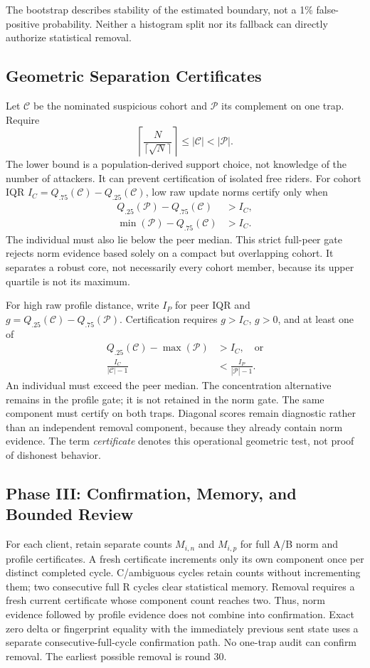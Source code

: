 \documentclass[conference]{IEEEtran}
\begin{document}
The bootstrap describes stability of the estimated boundary, not a 1\%
false-positive probability. Neither a histogram split nor its fallback can
directly authorize statistical removal.

\subsection{Geometric Separation Certificates}
Let $\mathcal C$ be the nominated suspicious cohort and $\mathcal P$ its
complement on one trap. Require
\begin{equation}
 \left\lceil\frac{N}{\lceil\sqrt N\rceil}\right\rceil
 \leq|\mathcal C|<|\mathcal P|.
\end{equation}
The lower bound is a population-derived support choice, not knowledge of the
number of attackers. It can prevent certification of isolated free riders.
For cohort IQR $I_C=Q_{.75}(\mathcal C)-Q_{.25}(\mathcal C)$, low raw update
norms certify only when
\begin{align}
 Q_{.25}(\mathcal P)-Q_{.75}(\mathcal C)&>I_C,\\
 \min(\mathcal P)-Q_{.75}(\mathcal C)&>I_C.
\end{align}
The individual must also lie below the peer median. This strict full-peer gate
rejects norm evidence based solely on a compact but overlapping cohort. It
separates a robust core, not necessarily every cohort member, because its upper
quartile is not its maximum.

For high raw profile distance, write $I_P$ for peer IQR and
$g=Q_{.25}(\mathcal C)-Q_{.75}(\mathcal P)$. Certification requires $g>I_C$,
$g>0$, and at least one of
\begin{align}
 Q_{.25}(\mathcal C)-\max(\mathcal P)&>I_C,\quad\text{or}\\
 \frac{I_C}{|\mathcal C|-1}&<\frac{I_P}{|\mathcal P|-1}.
\end{align}
An individual must exceed the peer median. The concentration alternative remains
in the profile gate; it is not retained in the norm gate. The same component
must certify on both traps. Diagonal scores remain diagnostic rather than an
independent removal component, because they already contain norm evidence.
The term \emph{certificate} denotes this operational geometric test, not proof
of dishonest behavior.

\subsection{Phase III: Confirmation, Memory, and Bounded Review}
For each client, retain separate counts $M_{i,n}$ and $M_{i,p}$ for full A/B
norm and profile certificates. A fresh certificate increments only its own
component once per distinct completed cycle. C/ambiguous cycles retain counts
without incrementing them; two consecutive full R cycles clear statistical
memory. Removal requires a fresh current certificate whose component count
reaches two. Thus, norm evidence followed by profile evidence does not combine
into confirmation. Exact zero delta or fingerprint equality with the immediately
previous sent state uses a separate consecutive-full-cycle confirmation path.
No one-trap audit can confirm removal. The earliest possible removal is round 30.
\end{document}
